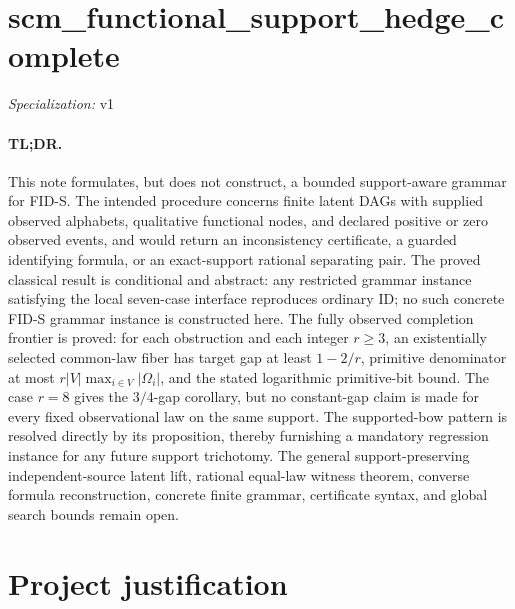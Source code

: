 \documentclass{article}
\begin{document}
\sloppy

\section*{scm\_\allowbreak{}functional\_\allowbreak{}support\_\allowbreak{}hedge\_\allowbreak{}complete}

\noindent\textit{Specialization:} v1\par

\paragraph{TL;DR.} This note formulates, but does not construct, a bounded support-aware grammar for FID-S. The intended procedure concerns finite latent DAGs with supplied observed alphabets, qualitative functional nodes, and declared positive or zero observed events, and would return an inconsistency certificate, a guarded identifying formula, or an exact-support rational separating pair. The proved classical result is conditional and abstract: any restricted grammar instance satisfying the local seven-case interface reproduces ordinary ID; no such concrete FID-S grammar instance is constructed here. The fully observed completion frontier is proved: for each obstruction and each integer \(r\geq 3\), an existentially selected common-law fiber has target gap at least \(1-2/r\), primitive denominator at most \(r|V|\max_{i\in V}|\Omega_i|\), and the stated logarithmic primitive-bit bound. The case \(r=8\) gives the \(3/4\)-gap corollary, but no constant-gap claim is made for every fixed observational law on the same support. The supported-bow pattern is resolved directly by its proposition, thereby furnishing a mandatory regression instance for any future support trichotomy. The general support-preserving independent-source latent lift, rational equal-law witness theorem, converse formula reconstruction, concrete finite grammar, certificate syntax, and global search bounds remain open.

\section{Project justification}
\end{document}
